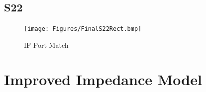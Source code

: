 \documentclass{article}                                                         %
\begin{document}
\begin{appendices}
\subsection{S22}
\begin{figure}[H]
  \centering
  \texttt{[image: Figures/FinalS22Rect.bmp]}
  \caption{IF Port Match}
    \label{fig:cS22}
\end{figure}

\section{Improved Impedance Model}\label{app:imp}

\end{appendices}
\end{document}
